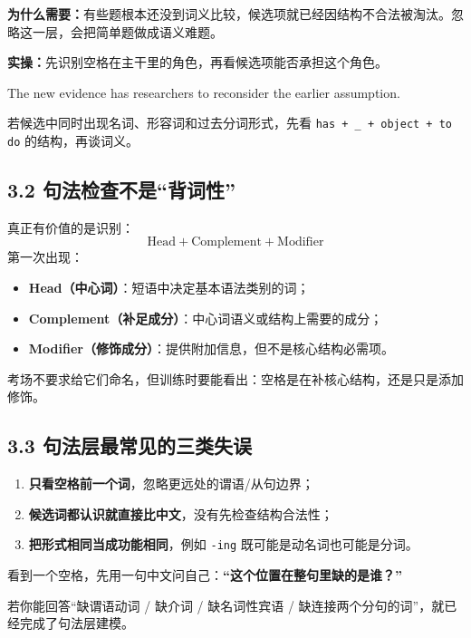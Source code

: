 \documentclass[11pt,a4paper]{ctexart}
\newcommand{\kw}[1]{\textbf{#1}}
\newcommand{\term}[2]{\textbf{#1（#2）}}
\begin{document}
\kw{为什么需要：}有些题根本还没到词义比较，候选项就已经因结构不合法被淘汰。忽略这一层，会把简单题做成语义难题。

\kw{实操：}先识别空格在主干里的角色，再看候选项能否承担这个角色。

\begin{eng}
The new evidence has \underline{\hspace{1.3cm}} researchers to reconsider the earlier assumption.

若候选中同时出现名词、形容词和过去分词形式，先看 \texttt{has + \_ + object + to do} 的结构，再谈词义。
\end{eng}

\subsection{3.2 句法检查不是“背词性”}
真正有价值的是识别：
\[
\boxed{
\text{Head}
+
\text{Complement}
+
\text{Modifier}
}
\]
第一次出现：
\begin{itemize}
  \item \term{Head}{中心词}：短语中决定基本语法类别的词；
  \item \term{Complement}{补足成分}：中心词语义或结构上需要的成分；
  \item \term{Modifier}{修饰成分}：提供附加信息，但不是核心结构必需项。
\end{itemize}

考场不要求给它们命名，但训练时要能看出：空格是在补核心结构，还是只是添加修饰。

\subsection{3.3 句法层最常见的三类失误}
\begin{enumerate}
  \item \kw{只看空格前一个词}，忽略更远处的谓语/从句边界；
  \item \kw{候选词都认识就直接比中文}，没有先检查结构合法性；
  \item \kw{把形式相同当成功能相同}，例如 \texttt{-ing} 既可能是动名词也可能是分词。
\end{enumerate}

\begin{exam}[句法层的起手动作]
看到一个空格，先用一句中文问自己：\kw{“这个位置在整句里缺的是谁？”}

若你能回答“缺谓语动词 / 缺介词 / 缺名词性宾语 / 缺连接两个分句的词”，就已经完成了句法层建模。
\end{exam}
\end{document}
